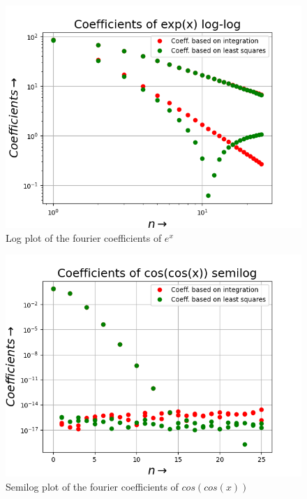 \documentclass[11pt, a4paper]{article}
\begin{document}
	\begin{figure}[!tbh]
   	\centering
   	\includegraphics[scale=0.6]{Figure_4.png}   
   	\caption{Log plot of the fourier coefficients of $e^{x}$}
   	\label{fig:sample}
   \end{figure} 
 
	\begin{figure}[!tbh]
   	\centering
   	\includegraphics[scale=0.6]{Figure_5.png}   
   	\caption{Semilog plot of the fourier coefficients of $cos(cos(x))$}
   	\label{fig:sample}
   \end{figure} 
\end{document}
